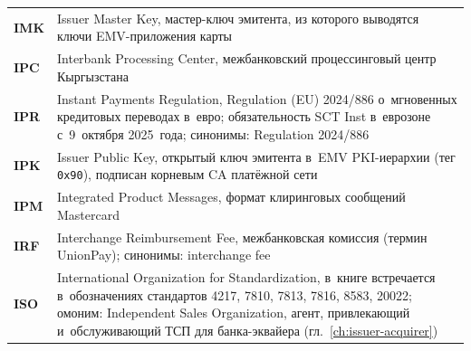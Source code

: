 \begin{longtable}{@{}p{4.5em}p{\dimexpr\linewidth-4.5em-2\tabcolsep\relax}@{}}
  \textbf{IMK}               & Issuer Master Key, мастер-ключ эмитента, из которого выводятся ключи EMV-приложения карты                                                                                                                                                                                                     \\
  \textbf{IPC}               & Interbank Processing Center, межбанковский процессинговый центр Кыргызстана                                                                                                                                                                                                                      \\
  \textbf{IPR}               & Instant Payments Regulation, Regulation (EU) 2024/886 о~мгновенных кредитовых переводах в~евро; обязательность SCT Inst в~еврозоне с~9~октября 2025~года; синонимы: Regulation 2024/886                                                                                                          \\
  \textbf{IPK}               & Issuer Public Key, открытый ключ эмитента в~EMV PKI-иерархии (тег \texttt{0x90}), подписан корневым CA платёжной сети                                                                                                                                                                          \\
  \textbf{IPM}               & Integrated Product Messages, формат клиринговых сообщений Mastercard                                                                                                                                                                                                                             \\
  \textbf{IRF}               & Interchange Reimbursement Fee, межбанковская комиссия (термин UnionPay); синонимы: interchange fee                                                                                                                                                                                                \\
  \textbf{ISO}               & International Organization for Standardization, в~книге встречается в~обозначениях стандартов 4217, 7810, 7813, 7816, 8583, 20022; омоним: Independent Sales Organization, агент, привлекающий и~обслуживающий ТСП для банка-эквайера (гл.~\ref{ch:issuer-acquirer})                                                                                                                                \\

\end{longtable}

